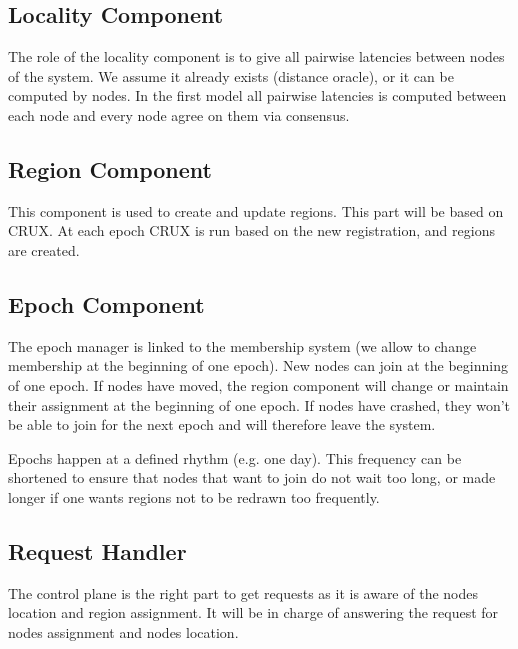 \documentclass[a4paper,11pt,oneside]{report}
\begin{document}
\subsection{Locality Component}

The role of the locality component is to give all pairwise latencies between
nodes of the system. We assume it already exists (distance oracle), or it can
be computed by nodes. In the first model all pairwise latencies is computed
between each node and every node agree on them via consensus. 
 
\subsection{Region Component} This component is used to create and update
regions. This part will be based on CRUX. At each epoch CRUX is run based on
the new registration, and regions are created.
 
\subsection{Epoch Component} The epoch manager is linked to the membership
system (we allow to change membership at the beginning of one epoch). New nodes
can join at the beginning of one epoch. If nodes have moved, the region
component will change or maintain their assignment at the beginning of one
epoch. If nodes have crashed, they won't be able to join for the next epoch and
will therefore leave the system.

Epochs happen at a defined rhythm (e.g. one day). This frequency can be
shortened to ensure that nodes that want to join do not wait too long, or made
longer if one wants regions not to be redrawn too frequently. 

\subsection{Request Handler} The control plane is the right part to get
requests as it is aware of the nodes location and region assignment. It will be
in charge of answering the request for nodes assignment and nodes location. 
\end{document}
